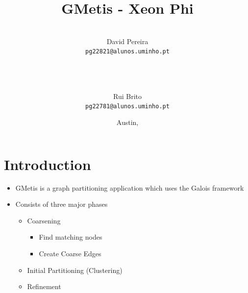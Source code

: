 \documentclass[abstract=on,9pt,twocolumn]{scrartcl}
\title{GMetis - Xeon Phi}
\author{
    \\David Pereira\\
     	\texttt{\smaller pg22821@alunos.uminho.pt}
\\~\\~
\and\\Rui Brito\\
	\texttt{\smaller pg22781@alunos.uminho.pt}
}
\date{Austin, \docdate}
\begin{document}
\maketitle	



\begin{abstract}

\end{abstract}



\section{Introduction}




\begin{itemize}
  \item GMetis is a graph partitioning application which uses the Galois
    framework
  \item Consists of three major phases
    \begin{itemize}
      \item Coarsening
      \begin{itemize}
        \item Find matching nodes
        \item Create Coarse Edges
      \end{itemize}
      \item Initial Partitioning (Clustering)
      \item Refinement
    \end{itemize}
\end{itemize}
\end{document}
